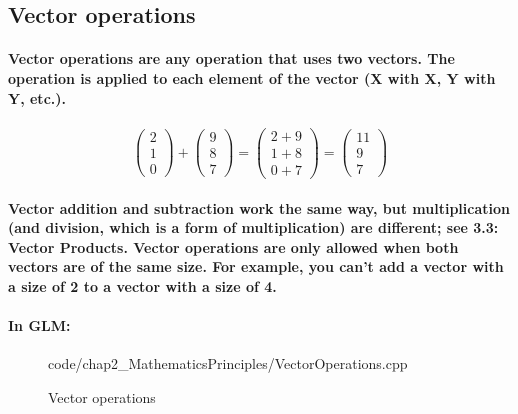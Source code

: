 \subsection{Vector operations}
\paragraph{
    Vector operations are any operation that uses two vectors. The operation is applied to each element of the vector (X with X, Y with Y, etc.).
}

\paragraph{
    \begin{equation*}
    \begin{pmatrix}
    2\\
    1\\
    0
    \end{pmatrix} +\begin{pmatrix}
    9\\
    8\\
    7
    \end{pmatrix} =\begin{pmatrix}
    2+9\\
    1+8\\
    0+7
    \end{pmatrix} =\begin{pmatrix}
    11\\
    9\\
    7
    \end{pmatrix}
    \end{equation*}
}

\paragraph{
    Vector addition and subtraction work the same way, but multiplication (and division, which is a form of multiplication) are different; see 3.3: Vector Products. Vector operations are only allowed when both vectors are of the same size. For example, you can't add a vector with a size of 2 to a vector with a size of 4.
}

\paragraph{
    In GLM:
}


\begin{frame}{}
    \begin{figure}[ht]
    \centering
    \colorbox{backgroundcolor}{
        \parbox{0.9\textwidth}{
            
            {code/chap2_MathematicsPrinciples/VectorOperations.cpp}
        }
    }
    \caption{Vector operations}
    \label{fig:vector_operations}
    \end{figure}
\end{frame}

